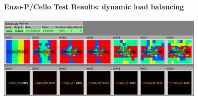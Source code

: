 \begin{frame}[fragile] 
\secframetitle{\ssTesting}
\framesubtitle{Enzo-P/Cello Test Results: dynamic load balancing}
\includegraphics[width=4.0in]{Images/cello-test-3.png}
\end{frame}

